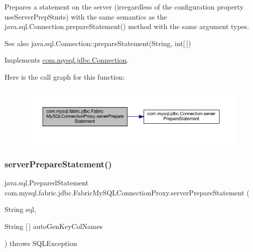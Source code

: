 Prepares a statement on the server (irregardless of the configuration property \textquotesingle{}use\+Server\+Prep\+Stmts\textquotesingle{}) with the same semantics as the java.\+sql.\+Connection.\+prepare\+Statement() method with the same argument types.

\begin{DoxySeeAlso}{See also}
java.\+sql.\+Connection\+::prepare\+Statement(\+String, int\mbox{[}$\,$\mbox{]}) 
\end{DoxySeeAlso}


Implements \mbox{\hyperlink{interfacecom_1_1mysql_1_1jdbc_1_1_connection_ad56f84a142159320cb267e94febd72d9}{com.\+mysql.\+jdbc.\+Connection}}.

Here is the call graph for this function\+:\nopagebreak
\begin{figure}[H]
\begin{center}
\leavevmode
\includegraphics[width=350pt]{classcom_1_1mysql_1_1fabric_1_1jdbc_1_1_fabric_my_s_q_l_connection_proxy_a023b1e89c0984415dfad1c569194eff9_cgraph}
\end{center}
\end{figure}
\mbox{\label{classcom_1_1mysql_1_1fabric_1_1jdbc_1_1_fabric_my_s_q_l_connection_proxy_a128a3b2a89feb4f14eabd24a9d7e7835}} 
\subsubsection{\texorpdfstring{server\+Prepare\+Statement()}{serverPrepareStatement()}\hspace{0.1cm}{\footnotesize\ttfamily [6/6]}}
{\footnotesize\ttfamily java.\+sql.\+Prepared\+Statement com.\+mysql.\+fabric.\+jdbc.\+Fabric\+My\+S\+Q\+L\+Connection\+Proxy.\+server\+Prepare\+Statement (\begin{DoxyParamCaption}\item[{String}]{sql,  }\item[{String \mbox{[}$\,$\mbox{]}}]{auto\+Gen\+Key\+Col\+Names }\end{DoxyParamCaption}) throws S\+Q\+L\+Exception}

